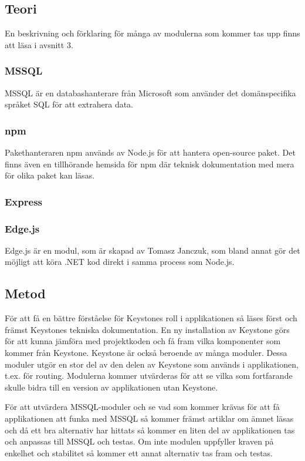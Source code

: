 \subsection{Teori}
En beskrivning och förklaring för många av modulerna som kommer tas upp finns att läsa i avsnitt 3.
\subsubsection{MSSQL}
MSSQL är en databashanterare från Microsoft som använder det domänspecifika språket SQL för att extrahera data.

\subsubsection{npm}
Pakethanteraren npm används av Node.js för att hantera open-source paket. Det finns även en tillhörande hemsida för npm där teknisk dokumentation med mera för olika paket kan läsas. 

\subsubsection{Express}

\subsubsection{Edge.js}
Edge.js är en modul, som är skapad av Tomasz Janczuk, som bland annat gör det möjligt att köra .NET kod direkt i samma process som Node.js. 


\subsection{Metod}
För att få en bättre förståelse för Keystones roll i applikationen så läses först och främst Keystones tekniska dokumentation. En ny installation av Keystone görs för att kunna jämföra med projektkoden och få fram vilka komponenter som kommer från Keystone. Keystone är också beroende av många moduler. Dessa moduler utgör en stor del av den delen av Keystone som används i applikationen, t.ex. för routing. Modulerna kommer utvärderas för att se vilka som fortfarande skulle bidra till en version av applikationen utan Keystone. 

För att utvärdera MSSQL-moduler och se vad som kommer krävas för att få applikationen att funka med MSSQL så kommer främst artiklar om ämnet läsas och då ett bra alternativ har hittats så kommer en liten del av applikationen tas och anpassas till MSSQL och testas. Om inte modulen uppfyller kraven på enkelhet och stabilitet så kommer ett annat alternativ tas fram och testas.


